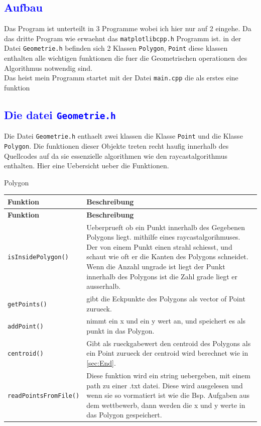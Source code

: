 \documentclass{article}
\begin{document}
\subsection{\textcolor{blue}{Aufbau}}
Das Program ist unterteilt in 3 Programme wobei ich hier nur auf 2 eingehe. Da das dritte Program wie erwaehnt das \texttt{matplotlibcpp.h} Programm ist. in der Datei \texttt{Geometrie.h} befinden sich 2 Klassen \texttt{Polygon}, \texttt{Point} diese klassen enthalten alle wichtigen funktionen die fuer die Geometrischen operationen des Algorithmus notwendig sind.
\\
Das heist mein Programm startet mit der Datei \texttt{main.cpp} die als erstes eine funktion
\subsection{\textcolor{blue}{Die datei \texttt{Geometrie.h}}}
Die Datei \texttt{Geometrie.h} enthaelt zwei klassen die Klasse \texttt{Point} und die Klasse \texttt{Polygon}. Die funktionen dieser Objekte treten recht haufig innerhalb des Quellcodes auf da sie essenzielle algorithmen wie den raycastalgorithmus enthalten. Hier eine Uebersicht ueber die Funktionen.
\par\medskip
\begin{center}\Large{ Polygon}\end{center}
\begin{longtable}{|>{\raggedright\arraybackslash}p{3.5cm}|p{11.5cm}|}
\hline
\textbf{Funktion} & \textbf{Beschreibung} \\
\hline
\endfirsthead
\hline
\textbf{Funktion} & \textbf{Beschreibung} \\
\hline
\endhead
\texttt{isInsidePolygon()} &
Ueberprueft ob ein Punkt innerhalb des Gegebenen Polygons liegt. mithilfe eines raycastalgorihmuses. Der von einem Punkt einen strahl schiesst, und schaut wie oft er die Kanten des Polygons schneidet. Wenn die Anzahl ungrade ist liegt der Punkt innerhalb des Polygons ist die Zahl grade liegt er ausserhalb. \\
\hline
\texttt{getPoints()} & gibt die Eckpunkte des Polygons als vector of Point zurueck.
\\
\hline
\texttt{addPoint()} & nimmt ein x und ein y wert an, und speichert es als punkt in das Polygon.
\\
\hline
\texttt{centroid()} & Gibt als rueckgabewert den centroid des Polygons als ein Point zurueck der centroid wird berechnet wie in \ref{sec:End}.
\\
\hline
\small{\texttt{readPointsFromFile()}} & Diese funktion wird ein string uebergeben, mit einem path zu einer .txt datei. Diese wird ausgelesen und wenn sie so vormatiert ist wie die Bsp. Aufgaben aus dem wettbewerb, dann werden die x und y werte in das Polygon gespeichert.
\\
\hline
\end{longtable}
\end{document}
